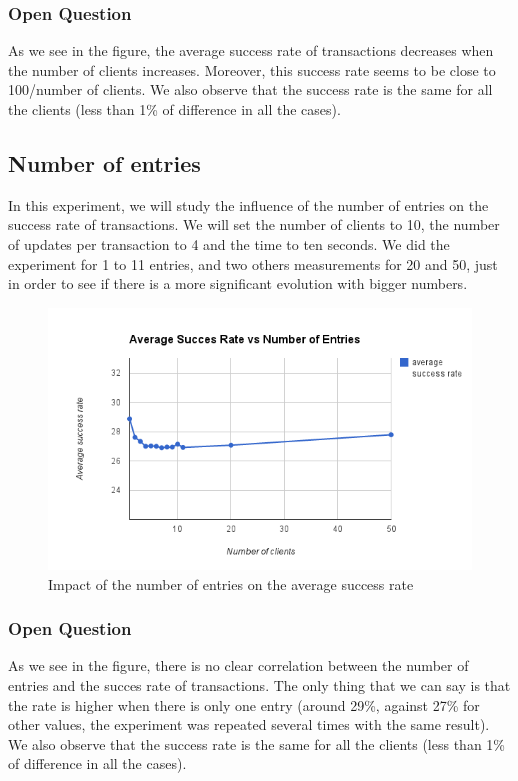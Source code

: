 \documentclass[a4paper, 11pt]{article}
\begin{document}
\subsubsection{Open Question}
As we see in the figure, the average success rate of transactions decreases when the number of clients increases. Moreover, this success rate seems to be close to 100/number of clients. We also observe that the success rate is the same for all the clients (less than 1\% of difference in all the cases).


\subsection{Number of entries}
In this experiment, we will study the influence of the number of entries on the success rate of transactions. We will set the number of clients to 10, the number of updates per transaction to 4 and the time to ten seconds. We did the experiment for 1 to 11 entries, and two others measurements for 20 and 50, just in order to see if there is a more significant evolution with bigger numbers.

\begin{figure}[H]
\begin{center}
\includegraphics[scale=0.5]{exp2.png}
\caption{Impact of the number of entries on the average success rate}
\end{center}
\end{figure}

\subsubsection{Open Question}
As we see in the figure, there is no clear correlation between the number of entries and the succes rate of transactions. The only thing that we can say is that the rate is higher when there is only one entry (around 29\%, against 27\% for other values, the experiment was repeated several times with the same result). We also observe that the success rate is the same for all the clients (less than 1\% of difference in all the cases).
\end{document}
